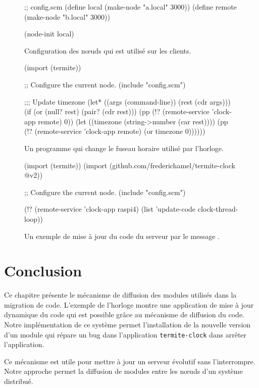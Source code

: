 \begin{figure}[ht]
\begin{center}
\begin{mplisting}{1}
;; config.scm
(define local (make-node "a.local" 3000))
(define remote (make-node "b.local" 3000))

(node-init local)
\end{mplisting}
\end{center}
  \caption{Configuration des nœuds qui est utilisé sur les clients.}
  \vspace*{4ex}
\end{figure}

\begin{figure}[ht]
\begin{center}
\begin{mplisting}{1}
(import (termite))

;; Configure the current node.
(include "config.scm")

;;; Update timezone
(let* ((args (command-line))
       (rest (cdr args)))
  (if (or (null? rest)
          (pair? (cdr rest)))
      (pp (!? (remote-service 'clock-app remote) 0))
      (let ((timezone (string->number (car rest))))
        (pp (!? (remote-service 'clock-app remote) (or timezone 0))))))
\end{mplisting}
\end{center}
  \caption{Un programme qui change le fuseau horaire utilisé par
    l'horloge.}
  \vspace*{4ex}
\end{figure}

\begin{figure}[ht]
\begin{center}
\begin{mplisting}{1}
(import (termite))
(import (github.com/frederichamel/termite-clock @v2))

;; Configure the current node.
(include "config.scm")

(!? (remote-service 'clock-app raspi4)
    (list 'update-code clock-thread-loop))
\end{mplisting}
\end{center}
  \caption{Un exemple de mise à jour du code du serveur
    par le message .}
  \vspace*{4ex}
\end{figure}

\section{Conclusion}
Ce chapitre présente le mécanisme de diffusion des modules utilisés
dans la migration de code. L'exemple de l'horloge montre une application
de mise à jour dynamique du code qui est possible grâce au mécanisme
de diffusion du code. Notre implémentation de ce système permet l'installation
de la nouvelle version d'un module qui répare un bug dans l'application
\texttt{termite-clock} dans arrêter l'application.

Ce mécanisme est utile pour mettre à jour un serveur évolutif
sans l'interrompre. Notre approche permet la diffusion de modules
entre les nœuds d'un système distribué.

